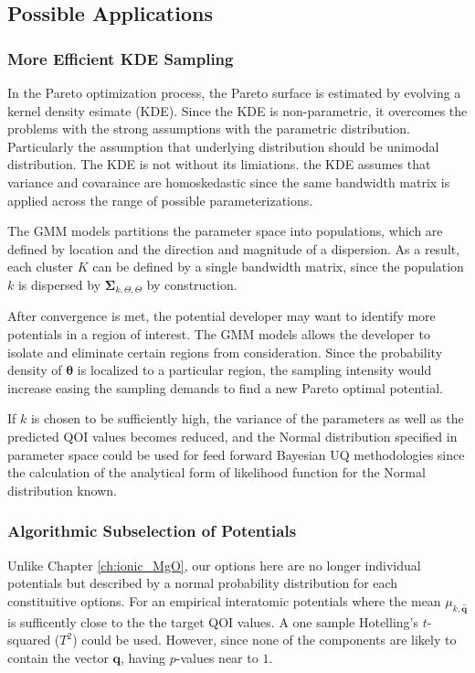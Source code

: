 \subsection{Possible Applications}

\subsubsection{More Efficient KDE Sampling}
In the Pareto optimization process, the Pareto surface is estimated by evolving a kernel density esimate (KDE).  Since the KDE is non-parametric, it overcomes the problems with the strong assumptions with the parametric distribution.  Particularly the assumption that underlying distribution should be unimodal distribution.  The KDE is not without its limiations. the KDE assumes that variance and covaraince are homoskedastic since the same bandwidth matrix is applied across the range of possible parameterizations.

The GMM models partitions the parameter space into populations, which are defined by location and the direction and magnitude of a dispersion.  As a result, each cluster $K$ can be defined by a single bandwidth matrix, since the population $k$ is dispersed by $\bm{\Sigma}_{k,\Theta,\Theta}$ by construction.

After convergence is met, the potential developer may want to identify more potentials in a region of interest.  The GMM models allows the developer to isolate and eliminate certain regions from consideration.  Since the probability density of $\bm{\theta}$ is localized to a particular region, the sampling intensity would increase easing the sampling demands to find a new Pareto optimal potential.

If $k$ is chosen to be sufficiently high, the variance of the parameters as well as the predicted QOI values becomes reduced, and the Normal distribution specified in parameter space could be used for feed forward Bayesian UQ methodologies since the calculation of the analytical form of likelihood function for the Normal distribution known.

\subsubsection{Algorithmic Subselection of Potentials}

Unlike Chapter \ref{ch:ionic_MgO}, our options here are no longer individual potentials but described by a normal probability distribution for each constituitive options.  For an empirical interatomic potentials where the mean $\mu_{k,\hat{\bm{q}}}$ is sufficently close to the the target QOI values.  A one sample Hotelling's $t$-squared  ($T^2$)\cite{hotelling1931_t2} could be used. However, since none of the components are likely to contain the vector $\bm{q}$, having $p$-values near to $1$.


